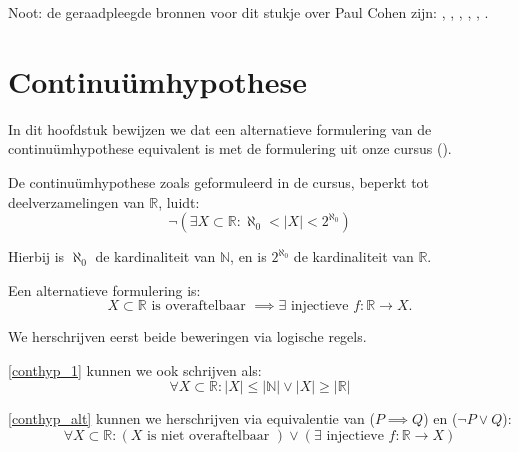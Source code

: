 \documentclass[hidelinks,11pt,a4paper]{article}
\begin{document}
Noot: de geraadpleegde bronnen voor dit stukje over Paul Cohen zijn:
\cite{wiki_en_cohen}, \cite{wiki_nl_cohen}, \cite{sarnak}, \cite{wiki_nl_fields}, \cite{wiki_en_cont}, \cite{wiki_en_hilb23}. 

\section{Continu\"umhypothese}
\label{sec_conthyp}

In dit hoofdstuk bewijzen we dat een alternatieve formulering van de continu\"um\-hypothese equivalent is met de formulering uit onze cursus (\cite{bew&red}). 

De continu\"um\-hypothese zoals geformuleerd in de cursus, beperkt tot deelverzamelingen van $\mathbb{R}$, luidt: 
\begin{equation}
\label{conthyp_1}
\neg ( \exists X \subset \mathbb{R} : \aleph_0 < |X| < 2^{\aleph_0} ) 
\end{equation}

Hierbij is $\aleph_0$ de kardinaliteit van $\mathbb{N}$, en is $2^{\aleph_0}$ de kardinaliteit van $\mathbb{R}$. 

Een alternatieve formulering is: 
\begin{equation}
\label{conthyp_alt}
X \subset \mathbb{R} \text{ is overaftelbaar } \implies \exists \text{ injectieve } f: \mathbb{R} \rightarrow X.
\end{equation}

We herschrijven eerst beide beweringen via logische regels. 

\eqref{conthyp_1} kunnen we ook schrijven als: 
\begin{equation}
\label{conthyp_2}
\forall X \subset \mathbb{R} : |X| \leq |\mathbb{N}| \lor |X| \geq |\mathbb{R}| 
\end{equation}

\eqref{conthyp_alt} kunnen we herschrijven via equivalentie van ($P \implies Q$) en ($\neg P \lor Q$): 
\begin{equation}
\label{conthyp_alt2}
\forall X \subset \mathbb{R} :  (X \text{ is niet overaftelbaar }) \lor (\exists \text{ injectieve } f: \mathbb{R} \rightarrow X)
\end{equation}
\end{document}
